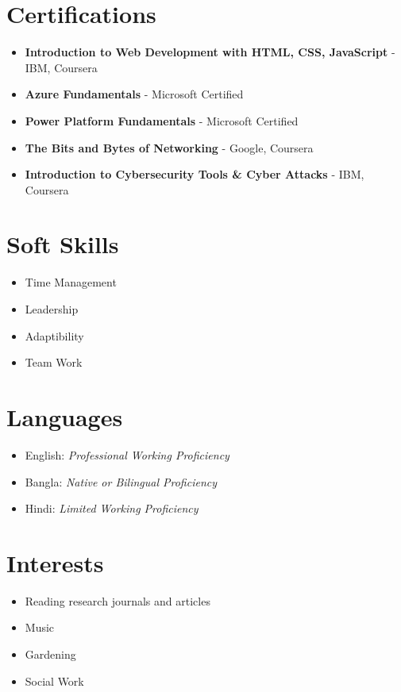 \documentclass[a4paper,11pt]{article}
\newcommand{\resumeItemListStart}{\begin{justify}\begin{itemize}[leftmargin=3ex, rightmargin=2ex, noitemsep,labelsep=1.2mm,itemsep=0mm]\small}
\newcommand{\resumeItemListEnd}{\end{itemize}\end{justify}\vspace{-2mm}}
\begin{document}
\section{\textbf{Certifications}}
    \resumeItemListStart
        \item {\textbf{Introduction to Web Development with HTML, CSS, JavaScript}}
        {- IBM, Coursera} %
        \item {\textbf{Azure Fundamentals}}
        {- Microsoft Certified} %
        \item {\textbf{Power Platform Fundamentals}}
        {- Microsoft Certified} %
        \item {\textbf{The Bits and Bytes of Networking}}
        {- Google, Coursera} %
        \item {\textbf{Introduction to Cybersecurity Tools \& Cyber Attacks}}
        {- IBM, Coursera} %
    \resumeItemListEnd
\vspace{-4mm}
\section{\textbf{Soft Skills}}
    \resumeItemListStart
    \item {Time Management}
    \item {Leadership}
    \item {Adaptibility}
    \item {Team Work}
\resumeItemListEnd
\vspace{-4mm}
\section{\textbf{Languages}}
    \resumeItemListStart
    \item English: \textit{Professional Working Proficiency}
    \item Bangla: \textit{Native or Bilingual Proficiency}
    \item Hindi: \textit{Limited Working Proficiency}
\resumeItemListEnd
\vspace{-4mm}
\section{\textbf{Interests}}
    \resumeItemListStart
    \item {Reading research journals and articles}
    \item {Music}
    \item {Gardening}
    \item {Social Work}
\resumeItemListEnd
\vspace{-4mm}
\end{document}
